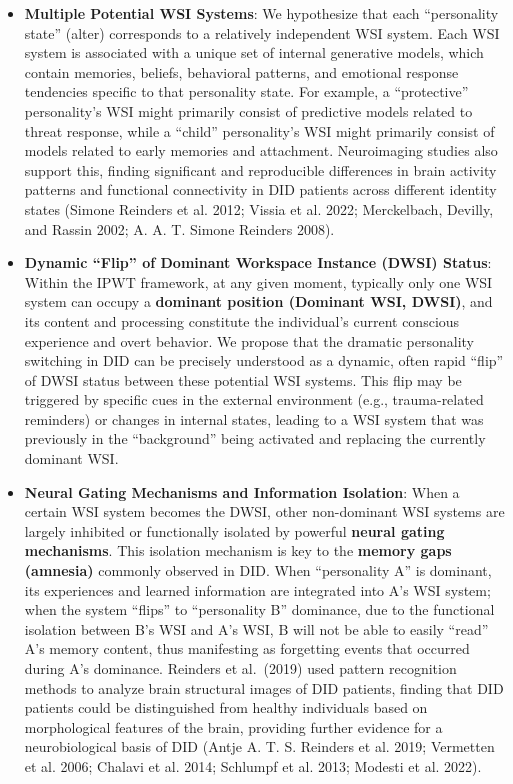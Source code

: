 \documentclass[
  a4paper]{article}
\begin{document}
\begin{itemize}
\item
  \textbf{Multiple Potential WSI Systems}: We hypothesize that each
  ``personality state'' (alter) corresponds to a relatively independent
  WSI system. Each WSI system is associated with a unique set of
  internal generative models, which contain memories, beliefs,
  behavioral patterns, and emotional response tendencies specific to
  that personality state. For example, a ``protective'' personality's
  WSI might primarily consist of predictive models related to threat
  response, while a ``child'' personality's WSI might primarily consist
  of models related to early memories and attachment. Neuroimaging
  studies also support this, finding significant and reproducible
  differences in brain activity patterns and functional connectivity in
  DID patients across different identity states (Simone Reinders et al.
  2012; Vissia et al. 2022; Merckelbach, Devilly, and Rassin 2002; A. A.
  T. Simone Reinders 2008).
\item
  \textbf{Dynamic ``Flip'' of Dominant Workspace Instance (DWSI)
  Status}: Within the IPWT framework, at any given moment, typically
  only one WSI system can occupy a \textbf{dominant position (Dominant
  WSI, DWSI)}, and its content and processing constitute the
  individual's current conscious experience and overt behavior. We
  propose that the dramatic personality switching in DID can be
  precisely understood as a dynamic, often rapid ``flip'' of DWSI status
  between these potential WSI systems. This flip may be triggered by
  specific cues in the external environment (e.g., trauma-related
  reminders) or changes in internal states, leading to a WSI system that
  was previously in the ``background'' being activated and replacing the
  currently dominant WSI.
\item
  \textbf{Neural Gating Mechanisms and Information Isolation}: When a
  certain WSI system becomes the DWSI, other non-dominant WSI systems
  are largely inhibited or functionally isolated by powerful
  \textbf{neural gating mechanisms}. This isolation mechanism is key to
  the \textbf{memory gaps (amnesia)} commonly observed in DID. When
  ``personality A'' is dominant, its experiences and learned information
  are integrated into A's WSI system; when the system ``flips'' to
  ``personality B'' dominance, due to the functional isolation between
  B's WSI and A's WSI, B will not be able to easily ``read'' A's memory
  content, thus manifesting as forgetting events that occurred during
  A's dominance. Reinders et al.~(2019) used pattern recognition methods
  to analyze brain structural images of DID patients, finding that DID
  patients could be distinguished from healthy individuals based on
  morphological features of the brain, providing further evidence for a
  neurobiological basis of DID (Antje A. T. S. Reinders et al. 2019;
  Vermetten et al. 2006; Chalavi et al. 2014; Schlumpf et al. 2013;
  Modesti et al. 2022).
\end{itemize}
\end{document}
